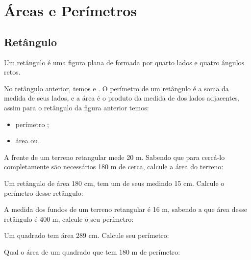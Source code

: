 \documentclass[twocolumn,oneside,a4paper,11pt]{article}
\begin{document}
\maketitle

\section*{Áreas e Perímetros}
\subsection*{Retângulo}
Um retângulo é uma figura plana de formada por quarto lados e quatro ângulos retos.


\noindent No retângulo anterior, temos  e . O perímetro de um retângulo é a soma da medida de seus lados, e a área é o produto da medida de dos lados adjacentes, assim para o retângulo da figura anterior temos:
\begin{itemize}
\item perímetro ;
\item área  ou .
\end{itemize}

\begin{exemplo}
 
\end{exemplo}

\begin{exemplo}
A frente de um terreno retangular mede 20 m. Sabendo que para cercá-lo completamente são necessários 180 m de cerca, calcule a área do terreno:
\end{exemplo}

\begin{exemplo}
Um retângulo de área 180 cm, tem um de seus medindo 15 cm. Calcule o perímetro desse retângulo:
\end{exemplo}

\begin{exemplo}
A medida dos fundos de um terreno retangular é 16 m, sabendo a que área desse retângulo é 400 m, calcule o seu perímetro:
\end{exemplo}

\begin{exemplo}
Um quadrado tem área 289 cm. Calcule seu perímetro:
\end{exemplo}

\begin{exemplo}
Qual o área de um quadrado que tem 180 m de perímetro:
\end{exemplo}
\end{document}
